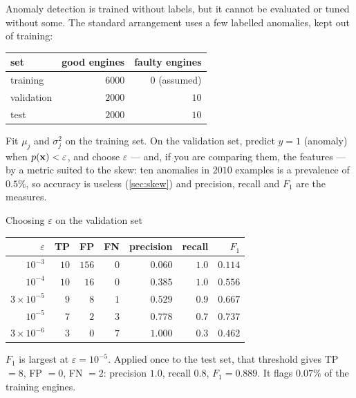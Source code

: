 Anomaly detection is trained without labels, but it cannot be evaluated or tuned
without some. The standard arrangement uses a few labelled anomalies, kept out of
training:

\begin{center}
\small
\renewcommand{\arraystretch}{1.15}
\begin{tabular}{@{}lrr@{}}
\toprule
set & good engines & faulty engines\\
\midrule
training   & $6000$ & $0$ (assumed)\\
validation & $2000$ & $10$\\
test       & $2000$ & $10$\\
\bottomrule
\end{tabular}
\end{center}

Fit $\mu_j$ and $\sigma_j^2$ on the training set. On the validation set, predict
$y = 1$ (anomaly) when $p(\mathbf{x}) < \varepsilon$, and choose $\varepsilon$ --- and,
if you are comparing them, the features --- by a metric suited to the skew: ten
anomalies in $2010$ examples is a prevalence of $0.5\%$, so accuracy is useless
(\cref{sec:skew}) and precision, recall and $F_1$ are the measures.

\begin{workedexample}{Choosing $\varepsilon$ on the validation set}
\begin{center}
\small
\renewcommand{\arraystretch}{1.15}
\begin{tabular}{@{}rrrrrrr@{}}
\toprule
$\varepsilon$ & TP & FP & FN & precision & recall & $F_1$\\
\midrule
$10^{-3}$          & $10$ & $156$ & $0$ & $0.060$ & $1.0$ & $0.114$\\
$10^{-4}$          & $10$ & $16$  & $0$ & $0.385$ & $1.0$ & $0.556$\\
$3\times10^{-5}$   & $9$  & $8$   & $1$ & $0.529$ & $0.9$ & $0.667$\\
$10^{-5}$          & $7$  & $2$   & $3$ & $0.778$ & $0.7$ & $\mathbf{0.737}$\\
$3\times10^{-6}$   & $3$  & $0$   & $7$ & $1.000$ & $0.3$ & $0.462$\\
\bottomrule
\end{tabular}
\end{center}

$F_1$ is largest at $\varepsilon = 10^{-5}$. Applied once to the test set, that
threshold gives TP $= 8$, FP $= 0$, FN $= 2$: precision $1.0$, recall $0.8$,
$F_1 = 0.889$. It flags $0.07\%$ of the training engines.
\end{workedexample}

